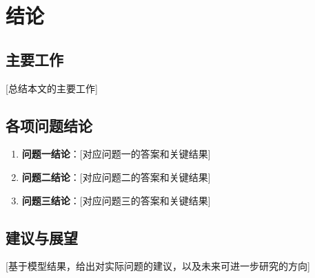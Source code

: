 
\section{结论}

\subsection{主要工作}

[总结本文的主要工作]

\subsection{各项问题结论}

\begin{enumerate}
    \item \textbf{问题一结论}：[对应问题一的答案和关键结果]
    \item \textbf{问题二结论}：[对应问题二的答案和关键结果]
    \item \textbf{问题三结论}：[对应问题三的答案和关键结果]
\end{enumerate}

\subsection{建议与展望}

[基于模型结果，给出对实际问题的建议，以及未来可进一步研究的方向]
